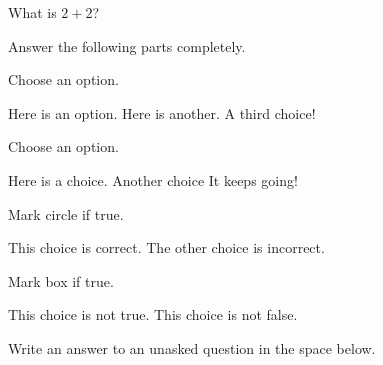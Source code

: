 \documentclass[12pt,letterpaper]{exam}
\newcommand{\answer}[1]{\hspace{\linewidth}\vfill\noindent\fbox{\begin{minipage}{\textwidth}\textbf{Answer:}\vspace{#1} \end{minipage}}}
\newcommand{\pspace}{\par\vspace{\baselineskip}}
\begin{document}
\begin{questions}


\question[20] What is $2+2$?
\answer{1cm}


\newpage
\question Answer the following parts completely. \vspace{0.5cm}


\newpage
\question[1] Choose an option.
	\begin{choices}
	\choice Here is an option.
	\choice Here is another.
	\choice A third choice!
	\end{choices}


\vspace{3cm}
\question[1] Choose an option. \pspace
	\begin{oneparchoices}
	\choice Here is a choice.
	\choice Another choice
	\choice It keeps going!
	\end{oneparchoices}


\vspace{3cm}
\question[1] Mark circle if true.
	\begin{checkboxes}
	\choice This choice is correct.
	\choice The other choice is incorrect. 
	\end{checkboxes}


\vspace{3cm}
{
\checkboxchar{$\Box$}
\question[3] Mark box if true.
	\begin{checkboxes}
	\choice This choice is not true.
	\choice This choice is not false. 
	\end{checkboxes}
}


\newpage
\question[1] Write an answer to an unasked question in the space below.
\makeemptybox{2in} %



\end{questions}
\end{document}
